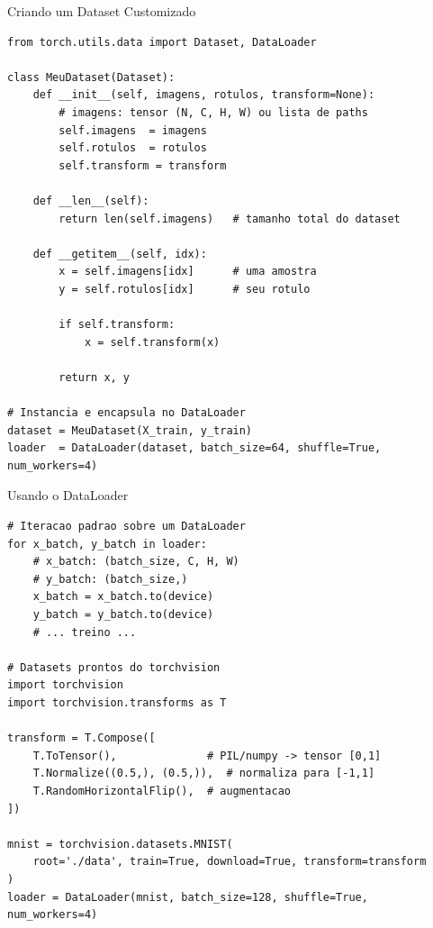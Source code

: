 \documentclass[aspectratio=169, 10pt]{beamer}
\begin{document}

\begin{frame}[fragile]{Criando um Dataset Customizado}
\begin{lstlisting}
from torch.utils.data import Dataset, DataLoader

class MeuDataset(Dataset):
    def __init__(self, imagens, rotulos, transform=None):
        # imagens: tensor (N, C, H, W) ou lista de paths
        self.imagens  = imagens
        self.rotulos  = rotulos
        self.transform = transform

    def __len__(self):
        return len(self.imagens)   # tamanho total do dataset

    def __getitem__(self, idx):
        x = self.imagens[idx]      # uma amostra
        y = self.rotulos[idx]      # seu rotulo

        if self.transform:
            x = self.transform(x)

        return x, y

# Instancia e encapsula no DataLoader
dataset = MeuDataset(X_train, y_train)
loader  = DataLoader(dataset, batch_size=64, shuffle=True, num_workers=4)
\end{lstlisting}
\end{frame}


\begin{frame}[fragile]{Usando o DataLoader}
\begin{lstlisting}
# Iteracao padrao sobre um DataLoader
for x_batch, y_batch in loader:
    # x_batch: (batch_size, C, H, W)
    # y_batch: (batch_size,)
    x_batch = x_batch.to(device)
    y_batch = y_batch.to(device)
    # ... treino ...

# Datasets prontos do torchvision
import torchvision
import torchvision.transforms as T

transform = T.Compose([
    T.ToTensor(),              # PIL/numpy -> tensor [0,1]
    T.Normalize((0.5,), (0.5,)),  # normaliza para [-1,1]
    T.RandomHorizontalFlip(),  # augmentacao
])

mnist = torchvision.datasets.MNIST(
    root='./data', train=True, download=True, transform=transform
)
loader = DataLoader(mnist, batch_size=128, shuffle=True, num_workers=4)
\end{lstlisting}
\end{frame}
\end{document}
